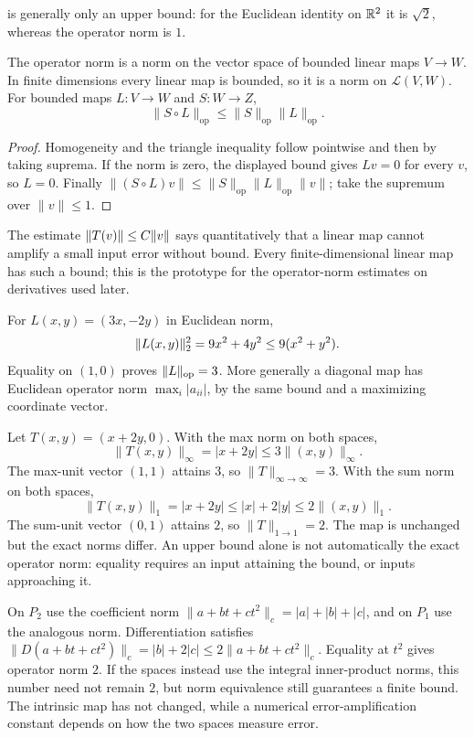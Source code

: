 is generally only an upper bound: for the Euclidean identity on $\mathbb{R}^2$
it is $\sqrt2$, whereas the operator norm is $1$.
\begin{proposition}
\label{prop:operator-norm-estimates}
The operator norm is a norm on the vector space of bounded linear maps
$V\to W$. In finite dimensions every linear map is bounded, so it is a
norm on $\mathcal L(V,W)$. For bounded maps $L:V\to W$ and $S:W\to Z$,
\[
\|S\circ L\|_{\mathrm{op}}
\leq\|S\|_{\mathrm{op}}\|L\|_{\mathrm{op}}.
\]
\end{proposition}
\begin{proof}
Homogeneity and the triangle inequality follow pointwise and then by taking
suprema. If the norm is zero, the displayed bound gives $Lv=0$ for every
$v$, so $L=0$. Finally
$\|(S\circ L)v\|\leq\|S\|_{\mathrm{op}}\|L\|_{\mathrm{op}}\|v\|$;
take the supremum over $\|v\|\leq1$.
\end{proof}



The estimate $\lVert T(v)\rVert\leq C\lVert v\rVert$ says quantitatively that a linear
map cannot amplify a small input error without bound.  Every
finite-dimensional linear map has such a bound; this is the prototype for
the operator-norm estimates on derivatives used later.

\begin{example}
For $L(x,y)=(3x,-2y)$ in Euclidean norm,
\[
\lVert L(x,y)\rVert_2^2=9x^2+4y^2\leq9(x^2+y^2).
\]
Equality on $(1,0)$ proves $\lVert L\rVert_{\mathrm{op}}=3$.
More generally a diagonal map has Euclidean operator norm
$\max_i|a_{ii}|$, by the same bound and a maximizing coordinate vector.
\end{example}
\begin{example}
Let $T(x,y)=(x+2y,0)$. With the max norm on both spaces,
\[
\|T(x,y)\|_\infty=|x+2y|\leq3\|(x,y)\|_\infty.
\]
The max-unit vector $(1,1)$ attains $3$, so
$\|T\|_{\infty\to\infty}=3$. With the sum norm on both spaces,
\[
\|T(x,y)\|_1=|x+2y|\leq|x|+2|y|\leq2\|(x,y)\|_1.
\]
The sum-unit vector $(0,1)$ attains $2$, so $\|T\|_{1\to1}=2$.
The map is unchanged but the exact norms differ. An upper bound alone is
not automatically the exact operator norm: equality requires an input
attaining the bound, or inputs approaching it.
\end{example}
\begin{example}
On $P_2$ use the coefficient norm
$\|a+bt+ct^2\|_c=|a|+|b|+|c|$, and on $P_1$ use the analogous
norm. Differentiation satisfies
$\|D(a+bt+ct^2)\|_c=|b|+2|c|\leq2\|a+bt+ct^2\|_c$.
Equality at $t^2$ gives operator norm $2$. If the spaces instead use
the integral inner-product norms, this number need not remain $2$, but
norm equivalence still guarantees a finite bound. The intrinsic map has
not changed, while a numerical error-amplification constant depends on
how the two spaces measure error.
\end{example}

